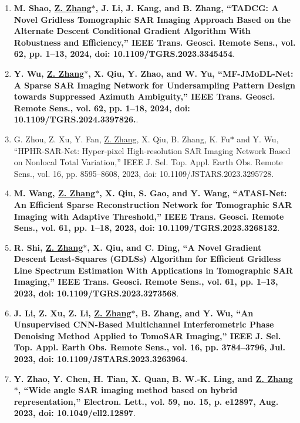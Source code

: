 \documentclass[paper=a4,fontsize=11pt]{scrartcl}
\begin{document}
\begin{enumerate}
\item \textbf{M. Shao, \underline{Z. Zhang$\ast$}, J. Li, J. Kang, and B. Zhang, ``TADCG: A Novel Gridless Tomographic SAR Imaging Approach Based on the Alternate Descent Conditional Gradient Algorithm With Robustness and Efficiency,'' IEEE Trans. Geosci. Remote Sens., vol. 62, pp. 1–13, 2024, doi: 10.1109/TGRS.2023.3345454}.
	
\item \textbf{Y. Wu, \underline{Z. Zhang$\ast$}, X. Qiu, Y. Zhao, and W. Yu, ``MF-JMoDL-Net: A Sparse SAR Imaging Network for Undersampling Pattern Design towards Suppressed Azimuth Ambiguity,'' IEEE Trans. Geosci. Remote Sens., vol. 62, pp. 1–18, 2024, doi: 10.1109/TGRS.2024.3397826.}.

\item G. Zhou, Z. Xu, Y. Fan, \underline{Z. Zhang}, X. Qiu, B. Zhang, K. Fu$\ast$ and Y. Wu, ``HPHR-SAR-Net: Hyper-pixel High-resolution SAR Imaging Network Based on Nonlocal Total Variation,'' IEEE J. Sel. Top. Appl. Earth Obs. Remote Sens., vol. 16, pp. 8595–8608, 2023, doi: 10.1109/JSTARS.2023.3295728.

\item \textbf{M. Wang, \underline{Z. Zhang$\ast$}, X. Qiu, S. Gao, and Y. Wang, ``ATASI-Net: An Efficient Sparse Reconstruction Network for Tomographic SAR Imaging with Adaptive Threshold,'' IEEE Trans. Geosci. Remote Sens., vol. 61, pp. 1–18, 2023, doi: 10.1109/TGRS.2023.3268132}.	
	
\item \textbf{R. Shi, \underline{Z. Zhang$\ast$}, X. Qiu, and C. Ding, ``A Novel Gradient Descent Least-Squares (GDLSs) Algorithm for Efficient Gridless Line Spectrum Estimation With Applications in Tomographic SAR Imaging,'' IEEE Trans. Geosci. Remote Sens., vol. 61, pp. 1–13, 2023, doi: 10.1109/TGRS.2023.3273568}.

\item \textbf{J. Li, Z. Xu, Z. Li, \underline{Z. Zhang$\ast$}, B. Zhang, and Y. Wu, ``An Unsupervised CNN-Based Multichannel Interferometric Phase Denoising Method Applied to TomoSAR Imaging,'' IEEE J. Sel. Top. Appl. Earth Obs. Remote Sens., vol. 16, pp. 3784–3796, Jul. 2023, doi: 10.1109/JSTARS.2023.3263964}.

\item \textbf{Y. Zhao, Y. Chen, H. Tian, X. Quan, B. W.-K. Ling, and \underline{Z. Zhang$\ast$}, ``Wide angle SAR imaging method based on hybrid representation,'' Electron. Lett., vol. 59, no. 15, p. e12897, Aug. 2023, doi: 10.1049/ell2.12897}.


\end{enumerate}
\end{document}
